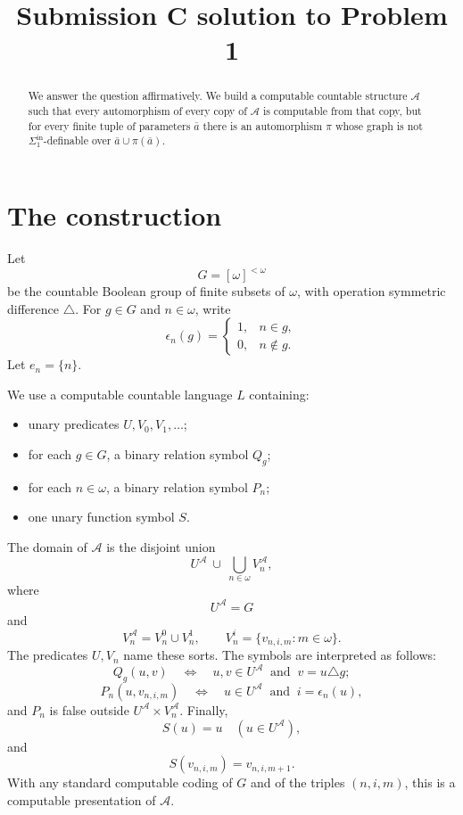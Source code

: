 \documentclass[11pt]{article}
\begin{document}
\title{Submission C solution to Problem 1}
\date{}
\maketitle


\begin{abstract}
We answer the question affirmatively.  We build a computable countable
structure $\mathcal A$ such that every automorphism of every copy of
$\mathcal A$ is computable from that copy, but for every finite tuple of
parameters $\bar a$ there is an automorphism $\pi$ whose graph is not
$\Sigma^{\mathrm{in}}_1$-definable over $\bar a\cup\pi(\bar a)$.
\end{abstract}

\section*{The construction}

Let
\[
G=[\omega]^{<\omega}
\]
be the countable Boolean group of finite subsets of $\omega$, with operation
symmetric difference $\triangle$.  For $g\in G$ and $n\in\omega$, write
\[
\epsilon_n(g)=
\begin{cases}
1,& n\in g,\\
0,& n\notin g.
\end{cases}
\]
Let $e_n=\{n\}$.

We use a computable countable language $L$ containing:
\begin{itemize}
\item unary predicates $U,V_0,V_1,\dots$;
\item for each $g\in G$, a binary relation symbol $Q_g$;
\item for each $n\in\omega$, a binary relation symbol $P_n$;
\item one unary function symbol $S$.
\end{itemize}

The domain of $\mathcal A$ is the disjoint union
\[
U^{\mathcal A}\ \cup\ \bigcup_{n\in\omega}V_n^{\mathcal A},
\]
where
\[
U^{\mathcal A}=G
\]
and
\[
V_n^{\mathcal A}=V_n^0\cup V_n^1,\qquad
V_n^i=\{v_{n,i,m}:m\in\omega\}.
\]
The predicates $U,V_n$ name these sorts.  The symbols are interpreted as follows:
\[
Q_g(u,v)\quad\Longleftrightarrow\quad u,v\in U^{\mathcal A}
\ \text{ and }\ v=u\triangle g;
\]
\[
P_n(u,v_{n,i,m})\quad\Longleftrightarrow\quad
u\in U^{\mathcal A}\ \text{ and }\ i=\epsilon_n(u),
\]
and $P_n$ is false outside $U^{\mathcal A}\times V_n^{\mathcal A}$.  Finally,
\[
S(u)=u\quad(u\in U^{\mathcal A}),
\]
and
\[
S(v_{n,i,m})=v_{n,i,m+1}.
\]
With any standard computable coding of $G$ and of the triples $(n,i,m)$, this is a computable presentation of $\mathcal A$.
\end{document}

